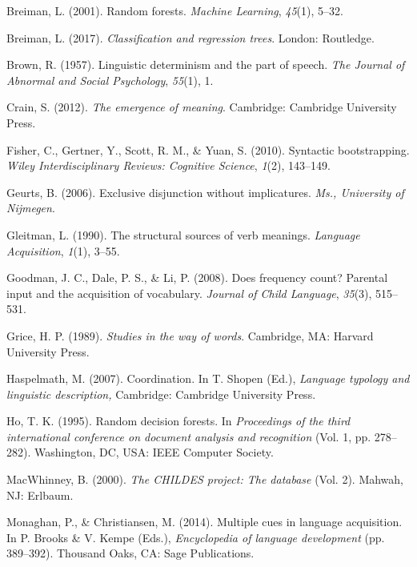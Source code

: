 \documentclass[floatsintext,man]{apa6}
\theoremstyle{definition}
\theoremstyle{definition}
\theoremstyle{definition}
\theoremstyle{remark}
\begin{document}
\hypertarget{ref-breiman2001random}{}
Breiman, L. (2001). Random forests. \emph{Machine Learning},
\emph{45}(1), 5--32.

\hypertarget{ref-breiman2017classification}{}
Breiman, L. (2017). \emph{Classification and regression trees}. London:
Routledge.

\hypertarget{ref-brown1957linguistic}{}
Brown, R. (1957). Linguistic determinism and the part of speech.
\emph{The Journal of Abnormal and Social Psychology}, \emph{55}(1), 1.

\hypertarget{ref-crain2012emergence}{}
Crain, S. (2012). \emph{The emergence of meaning}. Cambridge: Cambridge
University Press.

\hypertarget{ref-fisher2010syntactic}{}
Fisher, C., Gertner, Y., Scott, R. M., \& Yuan, S. (2010). Syntactic
bootstrapping. \emph{Wiley Interdisciplinary Reviews: Cognitive
Science}, \emph{1}(2), 143--149.

\hypertarget{ref-geurts2006exclusive}{}
Geurts, B. (2006). Exclusive disjunction without implicatures.
\emph{Ms., University of Nijmegen}.

\hypertarget{ref-gleitman1990structural}{}
Gleitman, L. (1990). The structural sources of verb meanings.
\emph{Language Acquisition}, \emph{1}(1), 3--55.

\hypertarget{ref-goodman2008does}{}
Goodman, J. C., Dale, P. S., \& Li, P. (2008). Does frequency count?
Parental input and the acquisition of vocabulary. \emph{Journal of Child
Language}, \emph{35}(3), 515--531.

\hypertarget{ref-grice1989studies}{}
Grice, H. P. (1989). \emph{Studies in the way of words}. Cambridge, MA:
Harvard University Press.

\hypertarget{ref-haspelmath2007}{}
Haspelmath, M. (2007). Coordination. In T. Shopen (Ed.), \emph{Language
typology and linguistic description,} Cambridge: Cambridge University
Press.

\hypertarget{ref-ho1995random}{}
Ho, T. K. (1995). Random decision forests. In \emph{Proceedings of the
third international conference on document analysis and recognition}
(Vol. 1, pp. 278--282). Washington, DC, USA: IEEE Computer Society.

\hypertarget{ref-macwhinney2000childes}{}
MacWhinney, B. (2000). \emph{The CHILDES project: The database} (Vol.
2). Mahwah, NJ: Erlbaum.

\hypertarget{ref-monaghan2014multiple}{}
Monaghan, P., \& Christiansen, M. (2014). Multiple cues in language
acquisition. In P. Brooks \& V. Kempe (Eds.), \emph{Encyclopedia of
language development} (pp. 389--392). Thousand Oaks, CA: Sage
Publications.
\end{document}
